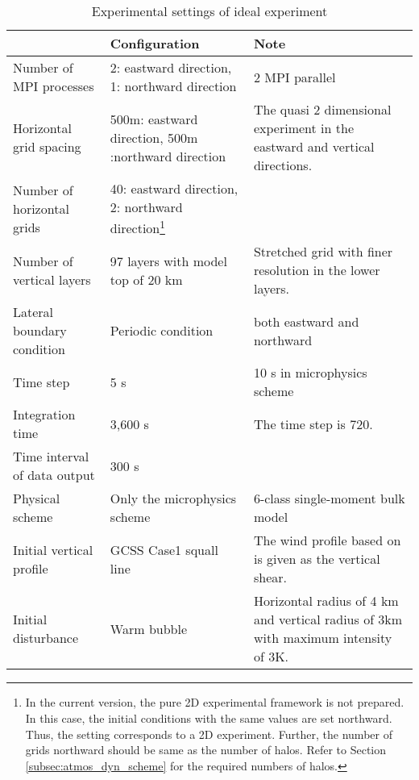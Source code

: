 \begin{table}[htb]
\begin{minipage}{150mm}
\begin{center}
\caption{Experimental settings of ideal experiment}
\begin{tabularx}{150mm}{|l|X|X|} \hline
 \rowcolor[gray]{0.9} ~~ & Configuration & Note \\ \hline
 Number of MPI processes& 2: eastward direction, 1: northward direction & 2 MPI parallel \\ \hline
 Horizontal grid spacing & 500m: eastward direction, 500m :northward direction & The quasi 2 dimensional experiment in the eastward and vertical directions. \\ \hline
 Number of horizontal grids & 40: eastward direction, 2: northward direction\footnote{In the current version, the pure 2D experimental framework is not prepared. In this case, the initial conditions with the same values are set northward. Thus, the setting corresponds to a 2D experiment. Further, the number of grids northward should be same as the number of halos. Refer to Section \ref{subsec:atmos_dyn_scheme} for the required numbers of halos.} &  \\ \hline
 Number of vertical layers & 97 layers with model top of 20 km & Stretched grid with finer resolution in the lower layers. \\ \hline
 Lateral boundary condition & Periodic condition & both eastward and northward \\ \hline
 Time step & 5 s      &  10 s in microphysics scheme\\ \hline
 Integration time     & 3,600 s & The time step is 720.\\ \hline
 Time interval of data output & 300 s  &  \\ \hline
 Physical scheme & Only the microphysics scheme &
 6-class single-moment bulk model \citep{tomita_2008} \\ \hline
 Initial vertical profile & GCSS Case1 squall line \citep{Redelsperger2000}&
 The wind profile based on \citet{Ooyama_2001} is given as the vertical shear. \\ \hline
 Initial disturbance & Warm bubble & Horizontal radius of 4 km and 
 vertical radius of 3km with  maximum intensity of 3K.\\ \hline
\end{tabularx}
\label{tab:setting_ideal}
\end{center}
\end{minipage}
\end{table}


